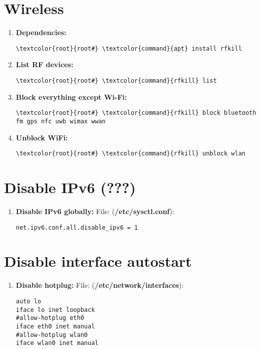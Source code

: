 \documentclass[10pt, a4paper, onecolumn, openany]{book} %
\begin{document}
\section{Wireless}
\begin{enumerate}
    \item \textbf{Dependencies:}
\begin{Verbatim}[commandchars=\\\{\}]
\textcolor{root}{root#} \textcolor{command}{apt} install rfkill
\end{Verbatim}
    \item \textbf{List RF devices:}
\begin{Verbatim}[commandchars=\\\{\}]
\textcolor{root}{root#} \textcolor{command}{rfkill} list
\end{Verbatim}
    \item \textbf{Block everything except Wi-Fi:}
\begin{Verbatim}[commandchars=\\\{\}]
\textcolor{root}{root#} \textcolor{command}{rfkill} block bluetooth fm gps nfc uwb wimax wwan
\end{Verbatim}
    \item \textbf{Unblock WiFi:}
\begin{Verbatim}[commandchars=\\\{\}]
\textcolor{root}{root#} \textcolor{command}{rfkill} unblock wlan
\end{Verbatim}
\end{enumerate}
\section{Disable IPv6 (???)}
\begin{enumerate}
    \item \textbf{Disable IPv6 globally:}
\newline File: (\textcolor{file}{\textbf{/etc/sysctl.conf}}):
\begin{Verbatim}[commandchars=\\\{\}]
net.ipv6.conf.all.disable_ipv6 = 1
\end{Verbatim}
\end{enumerate}
\section{Disable interface autostart}
\begin{enumerate}
    \item \textbf{Disable hotplug:}
\newline File: (\textbf{\textcolor{file}{/etc/network/interfaces}}):
\begin{Verbatim}[commandchars=\\\{\}]
auto lo
iface lo inet loopback
#allow-hotplug eth0
iface eth0 inet manual
#allow-hotplug wlan0
iface wlan0 inet manual
\end{Verbatim}
\end{enumerate}
\end{document}
